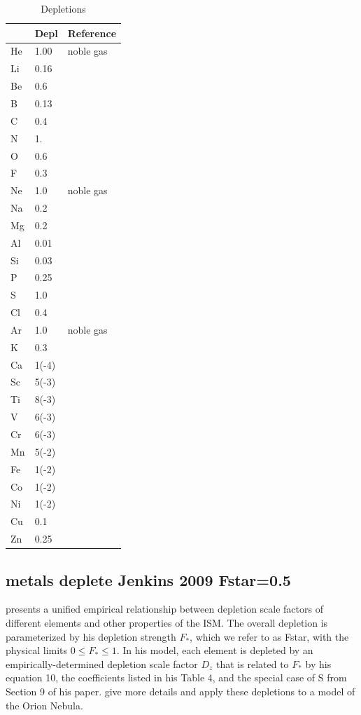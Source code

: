 \begin{table}
\centering
\caption{Depletions}
\label{tab:GrainGasDepletionFactors}
\begin{tabular}{lll}\hline
&Depl& Reference\\
\hline
He& 1.00& noble gas\\
Li& 0.16& \citealp{White1986}\\
Be& 0.6& \citealp{York1982}\\
B& 0.13& \citealp{Federman1993}\\
C& 0.4\\
N& 1.\\
O& 0.6\\
F& 0.3& \citealp{Snow1981}\\
Ne& 1.0& noble gas\\
Na& 0.2\\
Mg& 0.2\\
Al& 0.01\\
Si& 0.03\\
P& 0.25& \citealp{Cardelli1991}\\
S& 1.0\\
Cl& 0.4\\
Ar&1.0& noble gas\\
K& 0.3& \citealp{Chaffee1982}\\
Ca& 1(-4)\\
Sc& 5(-3)& \citealp{Snow1980}\\
Ti& 8(-3)& \citealp{Crinklaw1994}\\
V& 6(-3)& \citealp{Cardelli1994}\\
Cr& 6(-3)& \citealp{Cardelli1991}\\
Mn& 5(-2)& \citealp{Cardelli1991}\\
Fe& 1(-2)\\
Co& 1(-2)\\
Ni& 1(-2)\\
Cu& 0.1& \citealp{Cardelli1991}\\
Zn& 0.25& \citealp{Cardelli1991}\\
\hline
\end{tabular}
\end{table}

\subsection{metals deplete Jenkins 2009 Fstar=0.5}

\citet{2009ApJ...700.1299J} presents a unified empirical relationship between depletion
scale factors of different elements and other properties of the ISM.  
The overall depletion is parameterized by his depletion strength $F_*$, which we refer to as Fstar,
with the physical limits $0\leq F_* \leq 1$.
In his model, each element is depleted by an empirically-determined depletion scale factor $D_z$ that
is related to $F_*$ by his equation 10, the coefficients listed in his Table 4, 
and the special case of S from Section 9 of his paper.
\citet{2022MNRAS.512.2310G, 2023MNRAS.520.4345G}
give more details and apply
these depletions to a model of the Orion Nebula.

